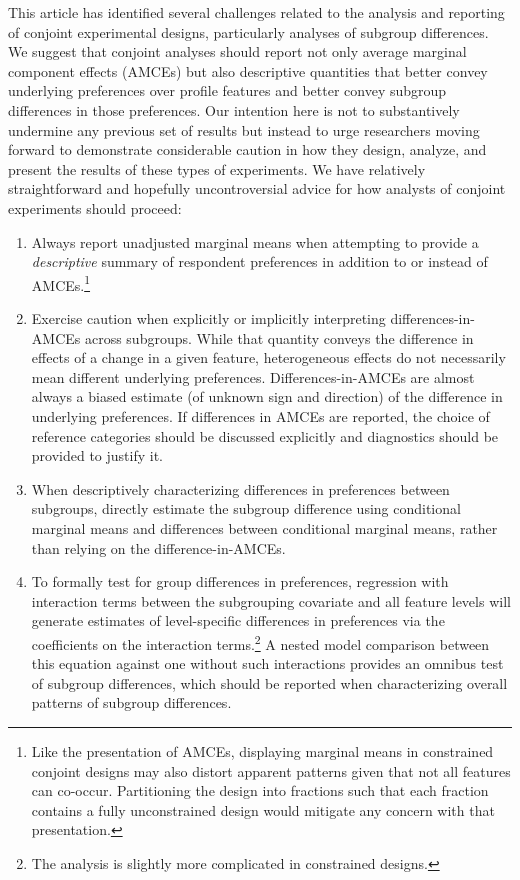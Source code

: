 \documentclass[a4paper,12pt]{article}\usepackage[]{graphicx}\usepackage[]{color}
\begin{document}
This article has identified several challenges related to the analysis and reporting of conjoint experimental designs, particularly analyses of subgroup differences. We suggest that conjoint analyses should report not only average marginal component effects (AMCEs) but also descriptive quantities that better convey underlying preferences over profile features and better convey subgroup differences in those preferences. Our intention here is not to substantively undermine any previous set of results but instead to urge researchers moving forward to demonstrate considerable caution in how they design, analyze, and present the results of these types of experiments. We have relatively straightforward and hopefully uncontroversial advice for how analysts of conjoint experiments should proceed:

\begin{enumerate}
\item Always report unadjusted marginal means when attempting to provide a \textit{descriptive} summary of respondent preferences in addition to or instead of AMCEs.\footnote{Like the presentation of AMCEs, displaying marginal means in constrained conjoint designs may also distort apparent patterns given that not all features can co-occur. Partitioning the design into fractions such that each fraction contains a fully unconstrained design would mitigate any concern with that presentation.}

\item Exercise caution when explicitly or implicitly interpreting differences-in-AMCEs across subgroups. While that quantity conveys the difference in effects of a change in a given feature, heterogeneous effects do not necessarily mean different underlying preferences. Differences-in-AMCEs are almost always a biased estimate (of unknown sign and direction) of the difference in underlying preferences. If differences in AMCEs are reported, the choice of reference categories should be discussed explicitly and diagnostics should be provided to justify it.

\item When descriptively characterizing differences in preferences between subgroups, directly estimate the subgroup difference using conditional marginal means and differences between conditional marginal means, rather than relying on the difference-in-AMCEs.

\item To formally test for group differences in preferences, regression with interaction terms between the subgrouping covariate and all feature levels will generate estimates of level-specific differences in preferences via the coefficients on the interaction terms.\footnote{The analysis is slightly more complicated in constrained designs.} A nested model comparison between this equation against one without such interactions provides an omnibus test of subgroup differences, which should be reported when characterizing overall patterns of subgroup differences.
\end{enumerate}
\end{document}
